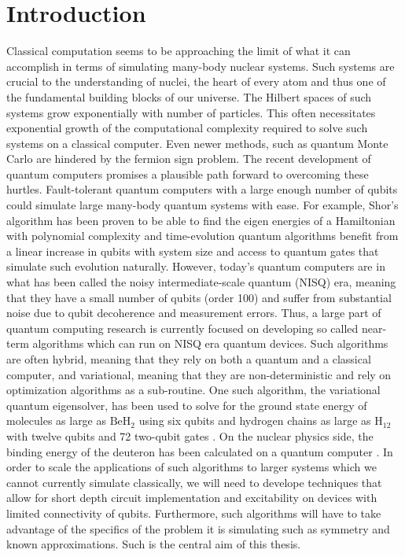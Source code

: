 \documentclass[10pt]{article}
\begin{document}
\chapter{Introduction}  

Classical computation seems to be approaching the limit of what it can accomplish in terms of simulating many-body nuclear systems. Such systems are crucial to the understanding of nuclei, the heart of every atom and thus one of the fundamental building blocks of our universe. The Hilbert spaces of such systems grow exponentially with number of particles. This often necessitates exponential growth of the computational complexity required to solve such systems on a classical computer. Even newer methods, such as quantum Monte Carlo are hindered by the fermion sign problem. The recent development of quantum computers promises a plausible path forward to overcoming these hurtles. Fault-tolerant quantum computers with a large enough number of qubits could simulate large many-body quantum systems with ease. For example, Shor's algorithm has been proven to be able to find the eigen energies of a Hamiltonian with polynomial complexity and time-evolution quantum algorithms benefit from a linear increase in qubits with system size and access to quantum gates that simulate such evolution naturally. However, today's quantum computers are in what has been called the noisy intermediate-scale quantum (NISQ) era, meaning that they have a small number of qubits (order 100) and suffer from substantial noise due to qubit decoherence and measurement errors. Thus, a large part of quantum computing research is currently focused on developing so called near-term algorithms which can run on NISQ era quantum devices. Such algorithms are often hybrid, meaning that they rely on both a quantum and a classical computer, and variational, meaning that they are non-deterministic and rely on optimization algorithms as a sub-routine. One such algorithm, the variational quantum eigensolver, has been used to solve for the ground state energy of molecules as large as $\text{BeH}_2$ \cite{beh2} using six qubits and hydrogen chains as large as $\text{H}_{12}$ with twelve qubits and 72 two-qubit gates \cite{h12}. On the nuclear physics side, the binding energy of the deuteron has been calculated on a quantum computer \cite{deuteron}. In order to scale the applications of such algorithms to larger systems which we cannot currently simulate classically, we will need to develope techniques that allow for short depth circuit implementation and excitability on devices with limited connectivity of qubits. Furthermore, such algorithms will have to take advantage of the specifics of the problem it is simulating such as symmetry and known approximations. Such is the central aim of this thesis. 
\end{document}
